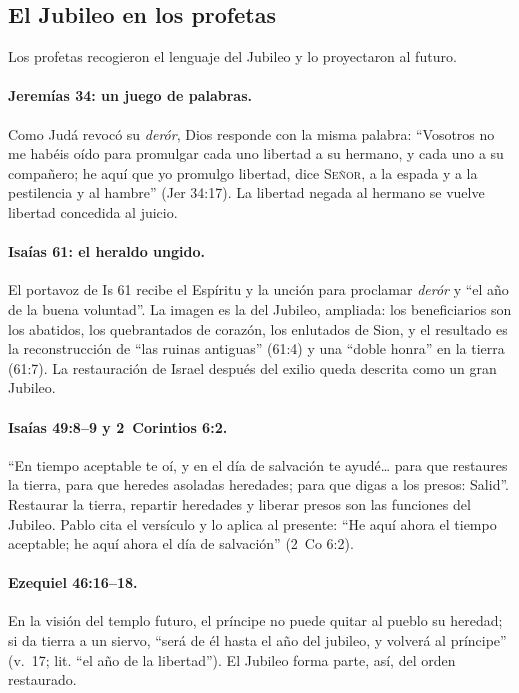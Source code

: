 \documentclass[11pt,letterpaper]{article}
\newcommand{\SENOR}{\textsc{Señor}}
\begin{document}
\subsection{El Jubileo en los profetas}
Los profetas recogieron el lenguaje del Jubileo y lo proyectaron al futuro.

\paragraph{Jeremías 34: un juego de palabras.} Como Judá revocó su \emph{derór}, Dios responde con la misma palabra: ``Vosotros no me habéis oído para promulgar cada uno libertad a su hermano, y cada uno a su compañero; he aquí que yo promulgo libertad, dice \SENOR, a la espada y a la pestilencia y al hambre'' (Jer 34:17). La libertad negada al hermano se vuelve libertad concedida al juicio.

\paragraph{Isaías 61: el heraldo ungido.} El portavoz de Is 61 recibe el Espíritu y la unción para proclamar \emph{derór} y ``el año de la buena voluntad''. La imagen es la del Jubileo, ampliada: los beneficiarios son los abatidos, los quebrantados de corazón, los enlutados de Sion, y el resultado es la reconstrucción de ``las ruinas antiguas'' (61:4) y una ``doble honra'' en la tierra (61:7). La restauración de Israel después del exilio queda descrita como un gran Jubileo.

\paragraph{Isaías 49:8--9 y 2~Corintios 6:2.} ``En tiempo aceptable te oí, y en el día de salvación te ayudé\ldots{} para que restaures la tierra, para que heredes asoladas heredades; para que digas a los presos: Salid''. Restaurar la tierra, repartir heredades y liberar presos son las funciones del Jubileo. Pablo cita el versículo y lo aplica al presente: ``He aquí ahora el tiempo aceptable; he aquí ahora el día de salvación'' (2~Co 6:2).

\paragraph{Ezequiel 46:16--18.} En la visión del templo futuro, el príncipe no puede quitar al pueblo su heredad; si da tierra a un siervo, ``será de él hasta el año del jubileo, y volverá al príncipe'' (v.~17; lit. ``el año de la libertad''). El Jubileo forma parte, así, del orden restaurado.
\end{document}
